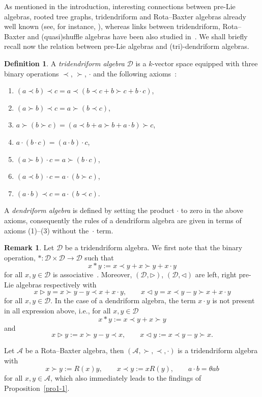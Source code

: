 \documentclass[pdftex]{sigma}
\numberwithin{equation}{section}
\theoremstyle{definition}
\newtheorem{defn}[thm]{Definition}
\newtheorem{rem}[thm]{Remark}
\begin{document}
As mentioned in the introduction, interesting connections between pre-Lie algebras, rooted tree graphs, tridendriform and Rota--Baxter algebras already well known (see, for instance, \mbox{\cite{Chap1, Fer}}), whereas links between tridendriform, Rota--Baxter and (quasi)shuffle algebras have been also studied in~\cite{LodaySh}. We shall briefly recall now the relation between pre-Lie algebras and (tri)-dendriform algebras.
\begin{defn}
A {\it tridendriform algebra} ${\mathcal D}$ is a $k$-vector space equipped with three binary operations $\prec$, $\succ$, $\cdot$ and the following axioms~\cite{Dendri, Loday}:
\begin{enumerate}\itemsep=0pt
\item[(1)] $(a \prec b) \prec c = a \prec (b\prec c + b\succ c + b\cdot c)$,
\item[(2)] $(a \succ b) \prec c = a \succ (b\prec c)$,
\item[(3)] $a \succ(b \succ c) = (a \prec b + a\succ b + a\cdot b)\succ c$,
\item[(4)] $a\cdot (b \cdot c) = (a\cdot b)\cdot c$,
\item[(5)] $(a\succ b) \cdot c = a\succ( b\cdot c)$,
\item[(6)] $(a\prec b) \cdot c = a\cdot(b\succ c)$,
\item[(7)] $(a\cdot b) \prec c = a\cdot (b\prec c)$.
\end{enumerate}
\end{defn}

 A {\it dendriform algebra} is defined by setting the product $\cdot$ to zero in the above axioms,
consequently the rules of a dendriform algebra are given in terms of axioms (1)--(3) without the~$\cdot$ term.

\begin{rem} Let ${\mathcal D}$ be a tridendriform algebra.
We first note that the binary operation, $*\colon {\mathcal D} \times {\mathcal D} \to {\mathcal D}$ such that
\[
x*y := x\prec y + x\succ y + x\cdot y
\]
for all $x,y \in {\mathcal D}$ is associative~\cite{Loday}. Moreover, $({\mathcal D}, \triangleright)$, $({\mathcal D}, \triangleleft)$ are left, right pre-Lie algebras respectively with
\[
x\triangleright y = x\succ y - y\prec x + x\cdot y, \qquad x\triangleleft y = x\prec y-y\succ x +x\cdot y
\]
for all $x,y \in {\mathcal D}$. In the case of a dendriform algebra, the term $x\cdot y$ is not present in all expression above, i.e., for all $x,y \in {\mathcal D}$
\[
x* y := x\prec y + x\succ y
\]
and
\[
x\triangleright y := x\succ y - y\prec x, \qquad x\triangleleft y := x\prec y-y\succ x .
\]

Let $\mathcal{A}$ be a Rota--Baxter algebra, then $(\mathcal{A},\succ,\prec, \cdot)$ is a tridendriform algebra with~\cite{RBLoday}
\begin{equation}
x\succ y := R(x) y, \qquad x\prec y := x R(y), \qquad a\cdot b = \theta ab \label{action2}
\end{equation}
for all $x,y\in \mathcal{A}$, which also immediately leads to the findings of Proposition~\ref{pro1-1}.
\end{rem}
\end{document}
